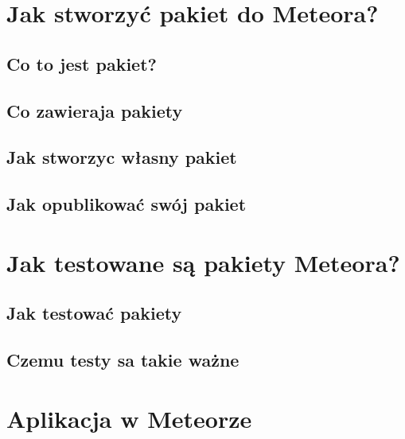 \documentclass[brudnopis]{xmgr}
\begin{document}
\chapter{Jak stworzyć pakiet do Meteora?}


\section{Co to jest pakiet?}

\section{Co zawieraja pakiety}

\section{Jak stworzyc własny pakiet}

\section{Jak opublikować swój pakiet}



\chapter{Jak testowane są pakiety Meteora?}

\section{Jak testować pakiety}

\section{Czemu testy sa takie ważne}



\chapter{Aplikacja w Meteorze}
\end{document}
